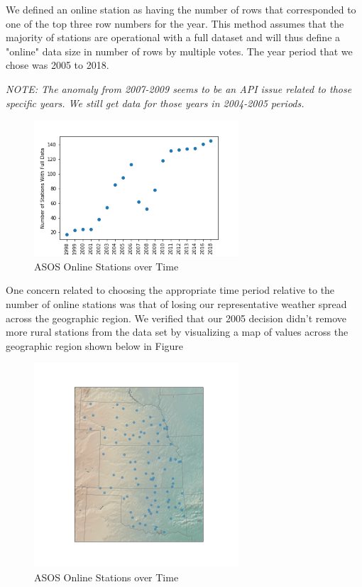 \documentclass[twoside,11pt]{article}
\begin{document}
	We defined an online station as having the number of rows that corresponded to one of the top three row numbers for the year. This method assumes that the majority of stations are operational with a full dataset and will thus define a "online" data size in number of rows by multiple votes. The year period that we chose was 2005 to 2018.
	
	\textit{NOTE: The anomaly from 2007-2009 seems to be an API issue related to those specific years. We still get data for those years in 2004-2005 periods.}
	
	\begin{figure}[htbp]
		\centering
		\includegraphics[width=3in]{ASOSstations.png}
		\caption{ASOS Online Stations over Time}
		\label{fig:asosstations}
	\end{figure}

	One concern related to choosing the appropriate time period relative to the number of online stations was that of losing our representative weather spread across the geographic region. We verified that our 2005 decision didn't remove more rural stations from the data set by visualizing a map of values across the geographic region shown below in Figure 
	
	\begin{figure}[htbp]
		\centering
		\includegraphics[width=3in]{ASOSspread.png}
		\caption{ASOS Online Stations over Time}
		\label{fig:asosspread}
	\end{figure}
	
\end{document}
